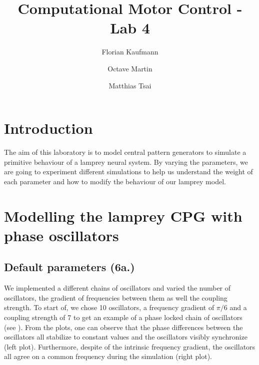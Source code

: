 \documentclass[a4paper]{scrartcl}
\title{Computational Motor Control - Lab 4}
\author{Florian Kaufmann \and Octave Martin \and Matthias Tsai}
\begin{document}
\maketitle

\section{Introduction}
The aim of this laboratory is to model central pattern generators to simulate a primitive behaviour of a lamprey neural system. By varying the parameters, we are going to experiment different simulations to help us understand the weight of each parameter and how to modify the behaviour of our lamprey model.

\section{Modelling the lamprey CPG with phase oscillators}
\subsection{Default parameters (6a.)}

We implemented a different chains of oscillators and varied the number of oscillators, the gradient of frequencies between them as well the coupling strength. To start of, we chose 10 oscillators, a frequency gradient of $\pi /6$ and a coupling strength of 7 to get an example of a phase locked chain of oscillators (see \cite{6astable}). From the plots, one can observe that the phase differences between the oscillators all stabilize to constant values and the oscillators visibly synchronize (left plot). Furthermore, despite of the intrinsic frequency gradient, the oscillators all agree on a common frequency during the simulation (right plot).
\end{document}
